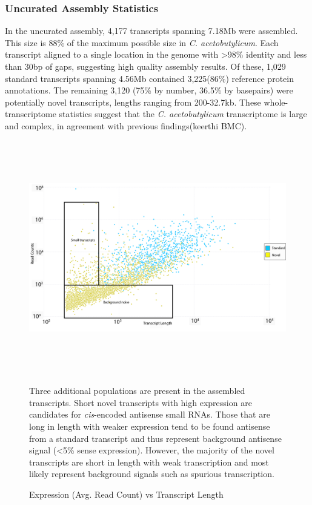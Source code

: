 \subsubsection{Uncurated Assembly Statistics}

In the uncurated assembly, 4,177 transcripts spanning 7.18Mb were assembled. This size is 88\% of the maximum possible size in \textit{C. acetobutylicum}. Each transcript aligned to a single location in the genome with \textgreater 98\% identity and less than 30bp of gaps, suggesting high quality assembly results. Of these, 1,029 standard transcripts spanning 4.56Mb contained 3,225(86\%) reference protein annotations. The remaining 3,120 (75\% by number, 36.5\% by basepairs) were potentially novel transcripts, lengths ranging from 200-32.7kb. These whole-transcriptome statistics suggest that the \textit{C. acetobutylicum} transcriptome is large and complex, in agreement with previous findings(keerthi BMC).

\begin{figure}[h!]
\small
\begin{center}
\includegraphics[width=\textwidth,height=4in]{images/Assembly/Summary/Depth_vs_length.png}
\end{center}
\caption{Expression (Avg. Read Count) vs Transcript Length}\label{fig:5.3}
Three additional populations are present in the assembled transcripts. Short novel transcripts with high expression are candidates for \textit{cis}-encoded antisense small RNAs. Those that are long in length with weaker expression tend to be found antisense from a standard transcript and thus represent background antisense signal (\textless 5\% sense expression). However, the majority of the novel transcripts are short in length with weak transcription and most likely represent background signals such as spurious transcription.
\end{figure}

